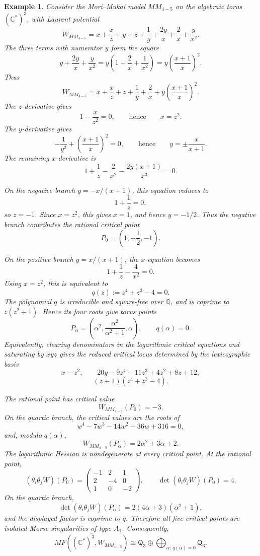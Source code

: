 \documentclass[11pt]{amsart}
\newtheorem{example}{Example}[section]
\newcommand{\MorseCat}[1]{\mathsf{Q}_{#1}}
\begin{document}
\begin{example}
Consider the Mori--Mukai model $MM_{4-5}$ on the algebraic torus
$(\mathbb{C}^*)^3$, with Laurent potential
\[
W_{MM_{4-5}}=x+\frac{x}{z}+y+z+\frac{1}{y}
+\frac{2y}{x}+\frac{2}{x}+\frac{y}{x^2}.
\]
The three terms with numerator $y$ form the square
\[
y+\frac{2y}{x}+\frac{y}{x^2}
=y\left(1+\frac{2}{x}+\frac{1}{x^2}\right)
=y\left(\frac{x+1}{x}\right)^2.
\]
Thus
\[
W_{MM_{4-5}}=x+\frac{x}{z}+z+\frac{1}{y}+\frac{2}{x}
+y\left(\frac{x+1}{x}\right)^2.
\]
The $z$-derivative gives
\[
1-\frac{x}{z^2}=0,
\qquad\text{hence}\qquad
x=z^2.
\]
The $y$-derivative gives
\[
-\frac{1}{y^2}+\left(\frac{x+1}{x}\right)^2=0,
\qquad\text{hence}\qquad
y=\pm\frac{x}{x+1}.
\]
The remaining $x$-derivative is
\[
1+\frac{1}{z}-\frac{2}{x^2}
-\frac{2y(x+1)}{x^3}=0.
\]

On the negative branch $y=-x/(x+1)$, this equation reduces to
\[
1+\frac{1}{z}=0,
\]
so $z=-1$. Since $x=z^2$, this gives $x=1$, and hence
$y=-1/2$. Thus the negative branch contributes the rational critical point
\[
P_0=\left(1,-\frac{1}{2},-1\right).
\]

On the positive branch $y=x/(x+1)$, the $x$-equation becomes
\[
1+\frac{1}{z}-\frac{4}{x^2}=0.
\]
Using $x=z^2$, this is equivalent to
\[
q(z):=z^4+z^3-4=0.
\]
The polynomial $q$ is irreducible and square-free over $\mathbb{Q}$, and is
coprime to $z(z^2+1)$. Hence its four roots give torus points
\[
P_\alpha=\left(
\alpha^2,
\frac{\alpha^2}{\alpha^2+1},
\alpha
\right),
\qquad
q(\alpha)=0.
\]
Equivalently, clearing denominators in the logarithmic critical equations and
saturating by $xyz$ gives the reduced critical locus determined by the
lexicographic basis
\[
x-z^2,
\qquad
20y-9z^4-11z^3+4z^2+8z+12,
\]
\[
(z+1)(z^4+z^3-4).
\]

The rational point has critical value
\[
W_{MM_{4-5}}(P_0)=-3.
\]
On the quartic branch, the critical values are the roots of
\[
w^4-7w^3-14w^2-36w+316=0,
\]
and, modulo $q(\alpha)$,
\[
W_{MM_{4-5}}(P_\alpha)=2\alpha^2+3\alpha+2.
\]
The logarithmic Hessian is nondegenerate at every critical point. At the
rational point,
\[
(\theta_i\theta_jW)(P_0)=
\begin{pmatrix}
-1 & 2 & 1 \\
2 & -4 & 0 \\
1 & 0 & -2
\end{pmatrix},
\qquad
\det(\theta_i\theta_jW)(P_0)=4.
\]
On the quartic branch,
\[
\det(\theta_i\theta_jW)(P_\alpha)
=2(4\alpha+3)(\alpha^2+1),
\]
and the displayed factor is coprime to $q$. Therefore all five critical points
are isolated Morse singularities of type $A_1$. Consequently,
\[
\overline{MF((\mathbb{C}^*)^3,W_{MM_{4-5}})}
\cong \MorseCat{3}\oplus \bigoplus_{\alpha:\,q(\alpha)=0}\MorseCat{3}.
\]
\end{example}
\end{document}

